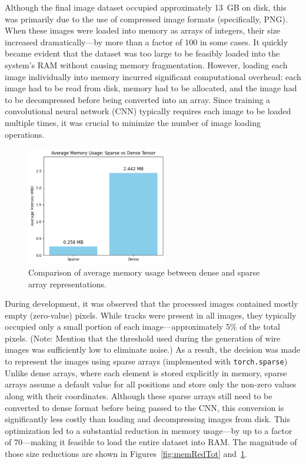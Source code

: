 \documentclass{pracalicmgr}
\begin{document}
Although the final image dataset occupied approximately 13~GB on disk, this was primarily due to the use of compressed image formats (specifically, PNG). When these images were loaded into memory as arrays of integers, their size increased dramatically—by more than a factor of 100 in some cases. It quickly became evident that the dataset was too large to be feasibly loaded into the system's RAM without causing memory fragmentation. However, loading each image individually into memory incurred significant computational overhead: each image had to be read from disk, memory had to be allocated, and the image had to be decompressed before being converted into an array. Since training a convolutional neural network (CNN) typically requires each image to be loaded multiple times, it was crucial to minimize the number of image loading operations.

\begin{figure}[H]
    \centering
    \includegraphics[width=0.55\textwidth]{src/sparseDenseComp.png}
    \caption{Comparison of average memory usage between dense and sparse array representations.}
    \label{fig:memRedAvg}
\end{figure}

During development, it was observed that the processed images contained mostly empty (zero-value) pixels. While tracks were present in all images, they typically occupied only a small portion of each image—approximately 5\% of the total pixels. (Note: Mention that the threshold used during the generation of wire images was sufficiently low to eliminate noise.) As a result, the decision was made to represent the images using sparse arrays (implemented with \texttt{torch.sparse}) Unlike dense arrays, where each element is stored explicitly in memory, sparse arrays assume a default value for all positions and store only the non-zero values along with their coordinates. Although these sparse arrays still need to be converted to dense format before being passed to the CNN, this conversion is significantly less costly than loading and decompressing images from disk. This optimization led to a substantial reduction in memory usage—by up to a factor of 70—making it feasible to load the entire dataset into RAM. The magnitude of those size reductions are shown in Figures~\ref{fig:memRedTot} and~\ref{fig:memRedAvg}.
\end{document}
